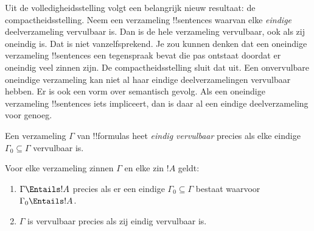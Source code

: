 \documentclass[../../../include/open-logic-section]{subfiles}
\begin{document}
      {}
      {}


Uit de volledigheidsstelling volgt een belangrijk nieuw resultaat: de
compactheidsstelling. Neem een verzameling !!{sentence}s waarvan elke
\emph{eindige} deelverzameling vervulbaar is. Dan is de hele verzameling
vervulbaar, ook als zij oneindig is. Dat is niet vanzelfsprekend. Je zou
kunnen denken dat een oneindige verzameling !!{sentence}s een tegenspraak
bevat die pas ontstaat doordat er oneindig veel zinnen zijn. De
compactheidsstelling sluit dat uit. Een onvervulbare oneindige
verzameling kan niet al haar eindige deelverzamelingen vervulbaar hebben.
Er is ook een vorm over semantisch gevolg. Als een oneindige verzameling
!!{sentence}s iets impliceert, dan is daar al een eindige deelverzameling
voor genoeg.

\begin{defn}
  Een verzameling $\Gamma$ van !!{formula}s heet \emph{eindig
  vervulbaar} precies als elke eindige $\Gamma_0 \subseteq \Gamma$
  vervulbaar is.
\end{defn}

\begin{thm}[Compactheidsstelling]
Voor elke verzameling zinnen $\Gamma$ en elke zin $!A$ geldt:
\begin{enumerate}
  \item $\Gamma \Entails !A$ precies als er een eindige
    $\Gamma_0 \subseteq \Gamma$ bestaat waarvoor
    $\Gamma_0 \Entails !A$.
  \item $\Gamma$ is vervulbaar precies als zij eindig vervulbaar is.
\end{enumerate}
\end{thm}
\end{document}

